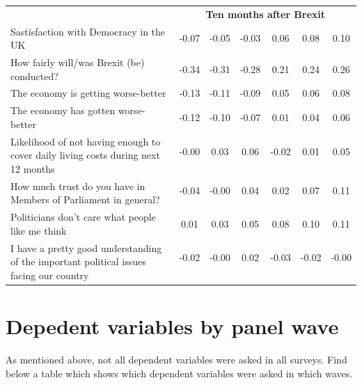 \documentclass[12pt, letter]{article}
\begin{document}
\begin{center}
\begin{longtable}{lcccccc}
\toprule[1pt]
& \multicolumn{6}{c}{\textbf{Ten months after Brexit}} \\[3pt]
Sastisfaction with Democracy in the UK & -0.07 & -0.05 & -0.03 & 0.06 & 0.08 & 0.10 \\[3pt] 
How fairly will/was Brexit (be) conducted? & -0.34 & -0.31 & -0.28 & 0.21 & 0.24 & 0.26 \\[3pt]
The economy is getting worse-better & -0.13 & -0.11 & -0.09 & 0.05 & 0.06 & 0.08 \\[3pt] 
The economy has gotten worse-better & -0.12 & -0.10 & -0.07 & 0.01 & 0.04 & 0.06 \\ [3pt] 
\multirow{2}{200pt}{Likelihood of not having enough to cover daily living costs during next 12 months} & -0.00 & 0.03 & 0.06 & -0.02 & 0.01 & 0.05 \\
\\[3pt]
\multirow{2}{200pt}{How much trust do you have in Members of Parliament in general?} & -0.04 & -0.00 & 0.04 & 0.02 & 0.07 & 0.11 \\ 
\\[3pt]
Politicians don't care what people like me think & 0.01 & 0.03 & 0.05 & 0.08 & 0.10 & 0.11 \\[3pt] 
\multirow{2}{200pt}{I have a pretty good understanding of the important political issues facing our country} & -0.02 & -0.00 & 0.02 & -0.03 & -0.02 & -0.00 \\ 
\\[3pt]
\toprule[1.5pt]



\end{longtable}
\end{center}

\section{Depedent variables by panel wave} \label{deppanelwave}
As mentioned above, not all dependent variables were asked in all surveys. Find below a table which shows which dependent variables were asked in which waves. 
\end{document}
